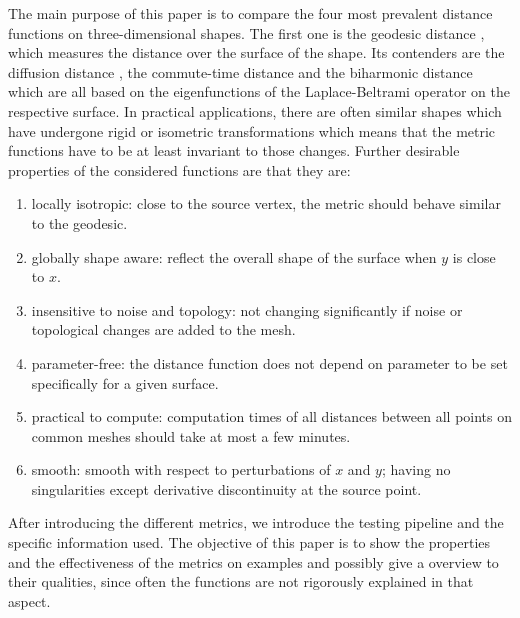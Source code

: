 The main purpose of this paper is to compare the four most prevalent distance functions on three-dimensional shapes.
The first one is the geodesic distance \cite{surazhsky2005fast,kimmel1998computing}, which measures the distance over the surface of the shape.
Its contenders are the diffusion distance \cite{sun2009concise}, the commute-time distance \cite{fouss2007random,lipman2010biharmonic} and the biharmonic distance \cite{lipman2010biharmonic} which are all based on the eigenfunctions of the Laplace-Beltrami operator on the respective surface.
In practical applications, there are often similar shapes which have undergone rigid or isometric transformations which means that the metric functions have to be at least invariant to those changes.
Further desirable properties of the considered functions are that they are:
\begin{enumerate}
	\item locally isotropic: close to the source vertex, the metric should behave similar to the geodesic.
	\item globally shape aware: reflect the overall shape of the surface when $y$ is close to $x$.
	\item insensitive to noise and topology: not changing significantly if noise or topological changes are added to the mesh.
	\item parameter-free: the distance function does not depend on parameter to be set specifically for a given surface.
	\item practical to compute: computation times of all distances between all points on common meshes should take at most a few minutes.
	\item smooth: smooth with respect to perturbations of $x$ and $y$; having no singularities except derivative discontinuity at the source point.
\end{enumerate}

After introducing the different metrics, we introduce the testing pipeline and the specific information used.
The objective of this paper is to show the properties and the effectiveness of the metrics on examples and possibly give a overview to their qualities, since often the functions are not rigorously explained in that aspect.

